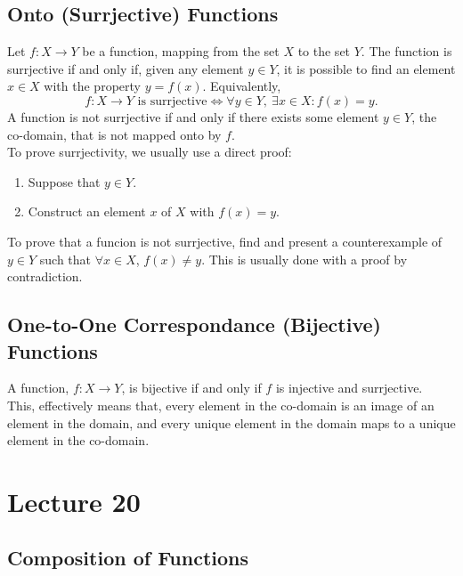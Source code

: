 \documentclass{report}
\begin{document}
\subsection*{Onto (Surrjective) Functions}
Let $f:X\to Y$ be a function, mapping from the set $X$ to the set $Y$. The function is surrjective if and only if, given any element $y\in Y$, it is possible to find an element $x\in X$ with the property $y=f(x)$. Equivalently, 
$$
	f:X\to Y \text{ is surrjective} \iff \forall y\in Y,\ \exists x\in X: f(x)=y.
$$
A function is not surrjective if and only if there exists some element $y\in Y$, the co-domain, that is not mapped onto by $f$. \\

To prove surrjectivity, we usually use a direct proof:
\begin{enumerate}
	\item Suppose that $y\in Y$.
	\item Construct an element $x$ of $X$ with $f(x)=y$.
\end{enumerate}
To prove that a funcion is not surrjective, find and present a counterexample of $y\in Y$ such that $\forall x\in X$, $f(x)\neq y$. This is usually done with a proof by contradiction.

\subsection*{One-to-One Correspondance (Bijective) Functions}
A function, $f:X\to Y$, is bijective if and only if $f$ is injective and surrjective. \\

This, effectively means that, every element in the co-domain is an image of an element in the domain, and every unique element in the domain maps to a unique element in the co-domain. \\


\section{Lecture 20}
\subsection*{Composition of Functions}
\end{document}
